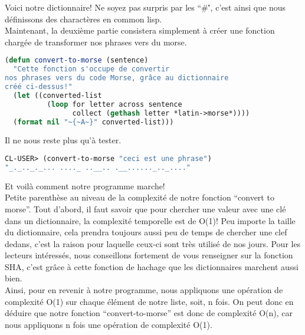 \documentclass[a4paper, 12pt]{article}
\numberwithin{equation}{subsection}
\begin{document}
Voici notre dictionnaire! Ne soyez pas surpris par les ``\#\'', c'est ainsi que nous définissons des charactères en common lisp. \\
Maintenant, la deuxième partie consistera simplement à créer une fonction chargée de transformer nos phrases vers du morse. \\
\begin{lstlisting}[language=Lisp]
(defun convert-to-morse (sentence)
  "Cette fonction s'occupe de convertir
nos phrases vers du code Morse, grâce au dictionnaire
créé ci-dessus!"
  (let ((converted-list
          (loop for letter across sentence
                collect (gethash letter *latin->morse*))))
  (format nil "~{~A~}" converted-list)))
\end{lstlisting}
Il ne nous reste plus qu'à tester.
\begin{lstlisting}[language=Lisp]
CL-USER> (convert-to-morse "ceci est une phrase")
"_._.._._... ...._ ..__.. .__......_.._...."
\end{lstlisting}
Et voilà comment notre programme marche! \\
Petite parenthèse au niveau de la complexité de notre fonction ``convert to morse''. Tout d'abord, il faut savoir que pour chercher une valeur avec une clé dans un dictionnaire, la complexité temporelle est de O(1)! Peu importe la taille du dictionnaire, cela prendra toujours aussi peu de temps de chercher une clef dedans, c'est la raison pour laquelle ceux-ci sont très utilisé de nos jours.
Pour les lecteurs intéressés, nous conseillons fortement de vous renseigner sur la fonction SHA, c'est grâce à cette fonction de hachage que les dictionnaires marchent aussi bien. \\
Ainsi, pour en revenir à notre programme, nous appliquons une opération de complexité O(1) sur chaque élément de notre liste, soit, n fois. On peut donc en déduire que notre fonction ``convert-to-morse'' est donc de complexité O(n), car nous appliquons n fois une opération de complexité O(1). \\[0.2cm]
\end{document}
